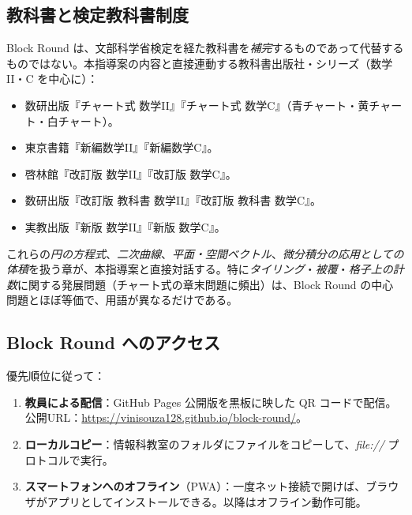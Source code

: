 \documentclass[12pt,a4paper]{scrartcl}
\begin{document}
\subsection{教科書と検定教科書制度}\label{sec:pnld}

Block Round は、文部科学省検定を経た教科書を\emph{補完}するものであって代替するものではない。本指導案の内容と直接連動する教科書出版社・シリーズ（数学II・C を中心に）：

\begin{itemize}[leftmargin=1.3em,itemsep=0.1em,topsep=0.2em,nosep]
  \item 数研出版『チャート式 数学II』『チャート式 数学C』（青チャート・黄チャート・白チャート）。
  \item 東京書籍『新編数学II』『新編数学C』。
  \item 啓林館『改訂版 数学II』『改訂版 数学C』。
  \item 数研出版『改訂版 教科書 数学II』『改訂版 教科書 数学C』。
  \item 実教出版『新版 数学II』『新版 数学C』。
\end{itemize}

これらの\emph{円の方程式}、\emph{二次曲線}、\emph{平面・空間ベクトル}、\emph{微分積分の応用としての体積}を扱う章が、本指導案と直接対話する。特に\emph{タイリング}・\emph{被覆}・\emph{格子上の計数}に関する発展問題（チャート式の章末問題に頻出）は、Block Round の中心問題とほぼ等価で、用語が異なるだけである。

\subsection{Block Round へのアクセス}

優先順位に従って：

\begin{enumerate}[leftmargin=1.5em,itemsep=0.15em,topsep=0.3em]
  \item \textbf{教員による配信}：GitHub Pages 公開版を黒板に映した QR コードで配信。公開URL：\url{https://vinisouza128.github.io/block-round/}。
  \item \textbf{ローカルコピー}：情報科教室のフォルダにファイルをコピーして、\emph{file://} プロトコルで実行。
  \item \textbf{スマートフォンへのオフライン}（PWA）：一度ネット接続で開けば、ブラウザがアプリとしてインストールできる。以降はオフライン動作可能。
\end{enumerate}

\end{document}
